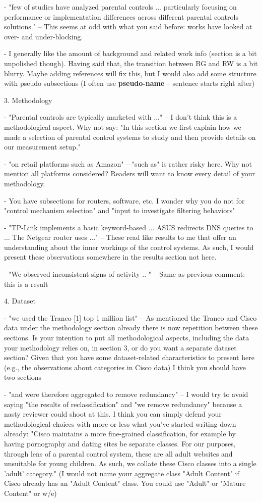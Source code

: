 - "few of studies have analyzed parental controls ... particularly focusing on performance or implementation differences across different parental controls solutions." -- This seems at odd with what you said before: works have looked at over- and under-blocking.

- I generally like the amount of background and related work info (section is a bit unpolished though). Having said that, the transition between BG and RW is a bit blurry. Maybe adding references will fix this, but I would also add some structure with pseudo subsections (I often use {\bf pseudo-name} -- sentence starts right after) 


3. Methodology

- "Parental controls are typically marketed with ..." -- I don't think this is a methodological aspect. Why not say: "In this section we first explain how we made a selection of parental control systems to study and then provide details on our measurement setup."

- "on retail platforms such as Amazon" -- "such as" is rather risky here. Why not mention all platforms considered? Readers will want to know every detail of your methodology.

- You have subsections for routers, software, etc. I wonder why you do not for "control mechanism selection" and "input to investigate filtering behaviors"

- "TP-Link implements a basic keyword-based ... ASUS redirects DNS queries to ... The Netgear router uses ..." -- These read like results to me that offer an understanding about the inner workings of the control systems. As such, I would present these observations somewhere in the results section not here.

- "We observed inconsistent signs of activity .. " -- Same as previous comment: this is a result

4. Dataset

- "we used the Tranco [1] top 1 million list" -- As mentioned the Tranco and Cisco data under the methodology section already there is now repetition between these sections. Is your intention to put all methodological aspects, including the data your methodology relies on, in section 3, or do you want a separate dataset section? Given that you have some dataset-related characteristics to present here (e.g., the observations about categories in Cisco data) I think you should have two sections

- "and were therefore aggregated to remove redundancy" -- I would try to avoid saying "the results of reclassification" and "we remove redundancy" because a nasty reviewer could shoot at this. I think you can simply defend your methodological choices with more or less what you've started writing down already: "Cisco maintains a more fine-grained classification, for example by having pornography and dating sites be separate classes. For our purposes, through lens of a parental control system, these are all adult websites and unsuitable for young children. As such, we collate these Cisco classes into a single 'adult' category." (I would not name your aggregate class "Adult Content" if Cisco already has an "Adult Content" class. You could use "Adult" or "Mature Content" or w/e) 

